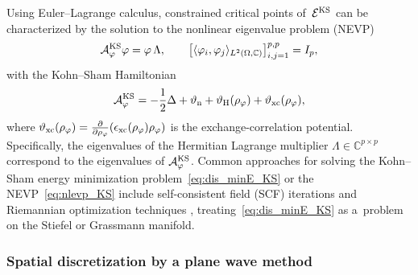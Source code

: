 \documentclass[11pt,reqno]{amsart}
\theoremstyle{plain}
\newcommand\C{\mathbb C}
\newcommand\calA{\mathcal A}
\newcommand\calE{\mathcal E}
\newcommand{\KS}{{\rm KS}}
\begin{document}
	Using Euler--Lagrange calculus, constrained critical points of $\,\calE^{\KS}$ can be characterized by the solution to the nonlinear eigenvalue problem (NEVP)
	\begin{equation}\label{eq:nlevp_KS}
		\begin{aligned}
			\calA_{\varphi}^{\KS}\varphi = \varphi\, \Lambda, \qquad
			\big[\langle \varphi_i, \varphi_j\rangle_{L^2(\Omega,\C)}\big]_{i,j=1}^{p,p} = I_p,
		\end{aligned}
	\end{equation}
	with the Kohn--Sham Hamiltonian 
	\[
	\calA_{\varphi}^{\KS} = - \frac{1}{2}\Delta  + \vartheta_{\rm n}  + \vartheta_{\rm H}(\rho_\varphi)  + \vartheta_{\rm xc}(\rho_\varphi),
	\]
	where \mbox{$\vartheta_{\rm xc}(\rho_\varphi)=\frac{\partial}{\partial\rho_\varphi}(\epsilon_{\rm xc}(\rho_\varphi)\rho_\varphi)$} is the exchange-correlation potential. 
	Specifically, the eigenvalues of the Hermitian Lagrange multiplier $\Lambda\in\C^{p\times p}$ correspond to the eigenvalues of $\calA_{\varphi}^{\KS}$. Common approaches for solving the Kohn--Sham energy minimization problem~\eqref{eq:dis_minE_KS} or the NEVP~\eqref{eq:nlevp_KS} include self-consistent field (SCF) iterations \cite{CanKL21,Roo51} and Riemannian optimization techniques \cite{AltPS22,AltPS24,PetPS25,SchRNB09}, treating~\eqref{eq:dis_minE_KS} as a~problem on the Stiefel or Grassmann manifold.
	
	\subsubsection{Spatial discretization by a plane wave method}
	
\end{document}
